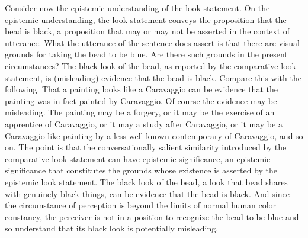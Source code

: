 \documentclass[12pt]{article}
\begin{document}
Consider now the epistemic understanding of the look statement. On the epistemic understanding, the look statement conveys the proposition that the bead is black, a proposition that may or may not be asserted in the context of utterance. What the utterance of the sentence does assert is that there are visual grounds for taking the bead to be blue. Are there such grounds in the present circumstances? The black look of the bead, as reported by the comparative look statement, is (misleading) evidence that the bead is black. Compare this with the following. That a painting looks like a Caravaggio can be evidence that the painting was in fact painted by Caravaggio. Of course the evidence may be misleading. The painting may be a forgery, or it may be the exercise of an apprentice of Caravaggio, or it may a study after Caravaggio, or it may be a Caravaggio-like painting by a less well known contemporary of Caravaggio, and so on. The point is that the conversationally salient similarity introduced by the comparative look statement can have epistemic significance, an epistemic significance that constitutes the grounds whose existence is asserted by the epistemic look statement. The black look of the bead, a look that bead shares with genuinely black things, can be evidence that the bead is black. And since the circumstance of perception is beyond the limits of normal human color constancy, the perceiver is not in a position to recognize the bead to be blue and so understand that its black look is potentially misleading. 
\end{document}
